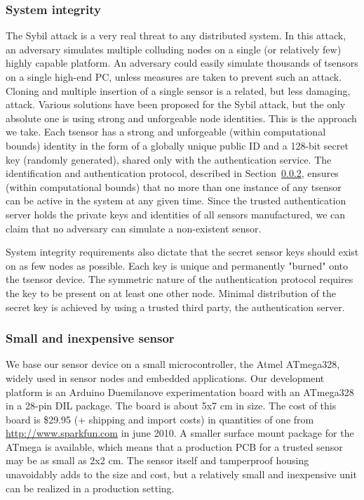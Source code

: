 \subsubsection{System integrity}

The Sybil attack \cite{Douceur2002} is a very real threat to any distributed system. In this attack, an adversary simulates multiple colluding nodes on a single (or relatively few) highly capable platform. An adversary could easily simulate thousands of tsensors on a single high-end PC, unless measures are taken to prevent such an attack. Cloning and multiple insertion of a single sensor is a related, but less damaging, attack.
%
Various solutions have been proposed for the Sybil attack, but the only absolute one is using strong and unforgeable node identities. This is the approach we take. Each tsensor has a strong and unforgeable (within computational bounds) identity in the form of a globally unique public ID and a 128-bit secret key (randomly generated), shared only with the authentication service. The identification and authentication protocol, described in Section~\ref{}, ensures (within computational bounds) that no more than one instance of any tsensor can be active in the system at any given time. Since the trusted authentication server holds the private keys and identities of all sensors manufactured, we can claim that no adversary can simulate a non-existent sensor.

System integrity requirements also dictate that the secret sensor keys should exist on as few nodes as possible. Each key is unique and permanently "burned" onto the tsensor device. The symmetric nature of the authentication protocol requires the key to be present on at least one other node. Minimal distribution of the secret key is achieved by using a trusted third party, the authentication server.

\subsubsection{Small and inexpensive sensor}

We base our sensor device on a small microcontroller, the Atmel ATmega328, widely used in sensor nodes and embedded applications. Our development platform is an Arduino Duemilanove experimentation board with an ATmega328 in a 28-pin DIL package. The board is about 5x7 cm in size.
The cost of this board is \$29.95 (+ shipping and import costs) in quantities of one from \url{http://www.sparkfun.com} in june 2010. 
%
A smaller surface mount package for the ATmega is available, which means that a production PCB for a trusted sensor may be as small as 2x2 cm. The sensor itself and tamperproof housing unavoidably adds to the size and cost, but a relatively small and inexpensive unit can be realized in a production setting.

